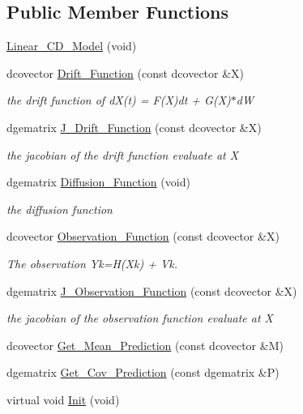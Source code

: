 \subsection*{Public Member Functions}
\begin{CompactItemize}
\item 
\hyperlink{class_linear___c_d___model_aff713973f904c1a509373259ffb2275}{Linear\_\-CD\_\-Model} (void)
\item 
dcovector \hyperlink{class_linear___c_d___model_4a35ab32a6ff01885368d1b3690f4925}{Drift\_\-Function} (const dcovector \&X)
\begin{CompactList}\small\item\em the drift function of dX(t) = F(X)dt + G(X)$\ast$dW \item\end{CompactList}\item 
dgematrix \hyperlink{class_linear___c_d___model_6d063fdeaeba656c8449e1539f422e1a}{J\_\-Drift\_\-Function} (const dcovector \&X)
\begin{CompactList}\small\item\em the jacobian of the drift function evaluate at X \item\end{CompactList}\item 
dgematrix \hyperlink{class_linear___c_d___model_f6959eff1f30ff1772b05a45c5756054}{Diffusion\_\-Function} (void)
\begin{CompactList}\small\item\em the diffusion function \item\end{CompactList}\item 
dcovector \hyperlink{class_linear___c_d___model_79ddecd171ea3725ed37ea689e53bf96}{Observation\_\-Function} (const dcovector \&X)
\begin{CompactList}\small\item\em The observation Yk=H(Xk) + Vk. \item\end{CompactList}\item 
dgematrix \hyperlink{class_linear___c_d___model_6188317af5df5b7d495f84256bb1c75a}{J\_\-Observation\_\-Function} (const dcovector \&X)
\begin{CompactList}\small\item\em the jacobian of the observation function evaluate at X \item\end{CompactList}\item 
dcovector \hyperlink{class_linear___c_d___model_1aa9a1ed9415253e316342e7b24c9966}{Get\_\-Mean\_\-Prediction} (const dcovector \&M)
\item 
dgematrix \hyperlink{class_linear___c_d___model_8dd88775ae8db03490c423bbfb108440}{Get\_\-Cov\_\-Prediction} (const dgematrix \&P)
\item 
virtual void \hyperlink{class_linear___c_d___model_c115137cf3ae0d1670880d5a8b0a8bd4}{Init} (void)
\end{CompactItemize}
